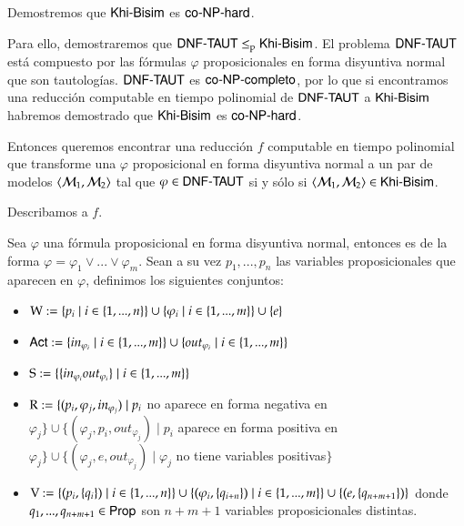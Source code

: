 \begin{demostracion}

    Demostremos que $\KHiBisim$ es $\coNPHard$.

    Para ello, demostraremos que $\DNFTAUT \leq_p \KHiBisim$. El problema $\DNFTAUT$ está compuesto 
    por las fórmulas $\varphi$ proposicionales en forma disyuntiva normal que son tautologías. 
    $\DNFTAUT$ es $\coNPComplete$, por lo que si encontramos una reducción computable en tiempo polinomial de 
    $\DNFTAUT$ a $\KHiBisim$ habremos demostrado que $\KHiBisim$ es $\coNPHard$.

    Entonces queremos encontrar una reducción $f$ computable en tiempo polinomial que transforme una $\varphi$ proposicional 
    en forma disyuntiva normal a un par de modelos $\tup{\modults_1,\modults_2}$ tal que $\varphi \in \DNFTAUT$ si y sólo si 
    $\tup{\modults_1,\modults_2} \in \KHiBisim$.

    Describamos a $f$.

    Sea $\varphi$ una fórmula proposicional en forma disyuntiva normal, entonces es de la forma 
    $\varphi = \varphi_1 \vee ... \vee \varphi_m$. Sean a su vez $p_1,...,p_n$ las variables proposicionales que aparecen en $\varphi$, 
    definimos los siguientes conjuntos:

    \begin{itemize}
        \item $\W := \{p_i\mid i\in\{1,...,n\}\} \cup \{\varphi_i \mid i \in \{1,...,m\}\} \cup \{e\}$
        \item $\ACT := \{in_{\varphi_i} \mid i \in \{1,...,m\}\} \cup \{out_{\varphi_i} \mid i \in \{1,...,m\}\}$
        \item $\S := \{\{in_{\varphi_i}out_{\varphi_i}\} \mid i \in \{1,...,m\}\}$
        \item $\R := \{(p_i,\varphi_j,in_{\varphi_j}) \mid p_i$ no aparece en forma negativa en $\varphi_j\} \cup 
                     \{(\varphi_j,p_i,out_{\varphi_j})\mid p_i$ aparece en forma positiva en $\varphi_j\} \cup 
                     \{(\varphi_j,e,out_{\varphi_j}) \mid \varphi_j$ no tiene variables positivas$\}$
        \item $\V := \{(p_i,\{q_i\}) \mid i \in \{1,...,n\}\} \cup 
                     \{(\varphi_i,\{q_{i+n}\}) \mid i \in \{1,...,m\}\} \cup 
                     \{(e,\{q_{n+m+1}\})\}$ donde $q_1,...,q_{n+m+1} \in \PROP$ son $n+m+1$ variables proposicionales distintas.
    \end{itemize}


\end{demostracion}
